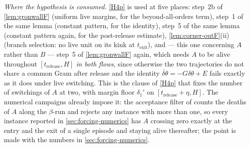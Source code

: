 \documentclass[11pt]{article}
\theoremstyle{definition}
\theoremstyle{remark}
\newcommand{\texit}{t_{\mathrm{exit}}}
\newcommand{\trel}{t_{\mathrm{release}}}
\begin{document}
\begin{enumerate}
\emph{Where the hypothesis is consumed.} \eqref{H4p} is used at five places: step~2b
of \cref{lem:gronwallF} (uniform live margins, for the beyond-all-orders term),
step~1 of the same lemma (constant pattern, for the identity), step~5 of the
same lemma (constant pattern again, for the post-release estimate),
\cref{lem:corner-outF}(ii) (branch selection: no live unit on its kink at
$\texit$), and --- this one concerning $A$ rather than $B$ --- step~5 of
\cref{lem:gronwallF} again, which needs $A$ to be alive throughout $[\trel,H]$
\emph{in both flows}, since otherwise the two trajectories do not share a common
Gram after release and the identity $\dot{\delta\theta}=-G\delta\theta+E$ fails
exactly as it does under live switching. This is the clause of \eqref{H4p} that
fixes the number of switchings of $A$ at two, with margin floor $\delta_1'$ on
$[\trel+\eta,H]$. The numerical campaigns already impose it: the acceptance
filter of  counts the deaths of $A$ along the
$\beta$-run and rejects any instance with more than one, so every instance
reported in \cref{sec:forcing-numerics} has $A$ crossing zero exactly at the
entry and the exit of a single episode and staying alive thereafter; the point
is made with the numbers in \cref{sec:forcing-numerics}.


\end{enumerate}
\end{document}
